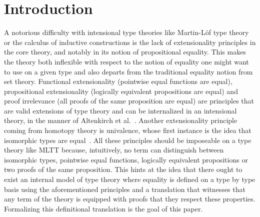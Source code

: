 \section{Introduction}
\label{sec:introduction}
A notorious difficulty with intensional type theories like Martin-Löf
type theory or the calculus of inductive constructions is the
lack of extensionality principles in the core theory, and notably in
its notion of propositional equality. This makes the theory both
inflexible with respect to the notion of equality one might want to
use on a given type and also departs from the traditional equality
notion from set theory. Functional extensionality (pointwise equal
functions are equal), propositional extensionality (logically
equivalent propositions are equal) and proof irrelevance (all proofs
of the same proposition are equal) are principles that are valid
extensions of type theory and can be internalized in an intensional
theory, in the manner of Altenkirch et al.~\cite{altenkirch-mcbride-wierstra:ott-now}.  Another
extensionality principle coming from homotopy theory is univalence,
whose first instance is the idea that isomorphic types are
equal~\cite{Voevodsky:2011yq,Pelayo:2012uq}. All these principles
should be imposeable on a type theory like MLTT because, intuitively,
no term can distinguish between isomorphic types, pointwise equal
functions, logically equivalent propositions or two proofs of the same
proposition. This hints at the idea that there ought to exist an
internal model of type theory where equality is defined on a type by
type basis using the aforementioned principles and a translation that
witnesses that any term of the theory is equipped with proofs that
they respect these properties. Formalizing this definitional
translation is the goal of this paper.


